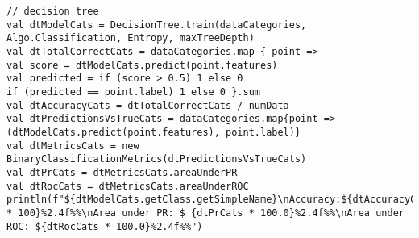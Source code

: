 \begin{lstlisting}
// decision tree
val dtModelCats = DecisionTree.train(dataCategories, Algo.Classification, Entropy, maxTreeDepth) 
val dtTotalCorrectCats = dataCategories.map { point =>
val score = dtModelCats.predict(point.features) 
val predicted = if (score > 0.5) 1 else 0
if (predicted == point.label) 1 else 0 }.sum
val dtAccuracyCats = dtTotalCorrectCats / numData
val dtPredictionsVsTrueCats = dataCategories.map{point =>
(dtModelCats.predict(point.features), point.label)}
val dtMetricsCats = new BinaryClassificationMetrics(dtPredictionsVsTrueCats) 
val dtPrCats = dtMetricsCats.areaUnderPR
val dtRocCats = dtMetricsCats.areaUnderROC
println(f"${dtModelCats.getClass.getSimpleName}\nAccuracy:${dtAccuracyCats * 100}%2.4f%%\nArea under PR: $ {dtPrCats * 100.0}%2.4f%%\nArea under ROC: ${dtRocCats * 100.0}%2.4f%%")
\end{lstlisting}

